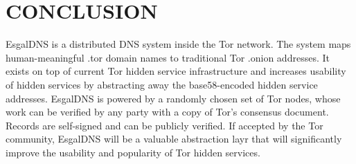 
\chapter{CONCLUSION}

EsgalDNS is a distributed DNS system inside the Tor network. The system maps human-meaningful .tor domain names to traditional Tor .onion addresses. It exists on top of current Tor hidden service infrastructure and increases usability of hidden services by abstracting away the base58-encoded hidden service addresses. EsgalDNS is powered by a randomly chosen set of Tor nodes, whose work can be verified by any party with a copy of Tor's consensus document. Records are self-signed and can be publicly verified. If accepted by the Tor community, EsgalDNS will be a valuable abstraction layr that will significantly improve the usability and popularity of Tor hidden services.
